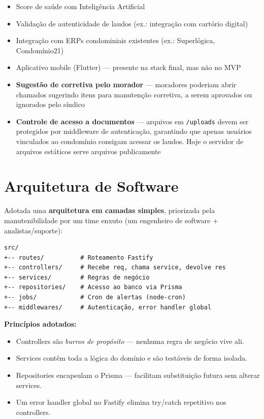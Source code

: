 \documentclass[12pt, a4paper]{article}
\begin{document}
\begin{itemize}[leftmargin=1.5em]
    \item Score de saúde com Inteligência Artificial
    \item Validação de autenticidade de laudos (ex.: integração com cartório digital)
    \item Integração com ERPs condominiais existentes (ex.: Superlógica, Condomínio21)
    \item Aplicativo mobile (Flutter) — presente na stack final, mas não no MVP
    \item \textbf{Sugestão de corretiva pelo morador} — moradores poderiam abrir chamados sugerindo itens para manutenção corretiva, a serem aprovados ou ignorados pelo síndico
    \item \textbf{Controle de acesso a documentos} — arquivos em \texttt{/uploads} devem ser protegidos por middleware de autenticação, garantindo que apenas usuários vinculados ao condomínio consigam acessar os laudos. Hoje o servidor de arquivos estáticos serve arquivos publicamente
\end{itemize}

\vspace{0.5cm}

\section{Arquitetura de Software}
\label{sec:arquitetura}

Adotada uma \textbf{arquitetura em camadas simples}, priorizada pela manutenibilidade
por um time enxuto (um engenheiro de software + analistas/suporte):

\begin{verbatim}
src/
+-- routes/          # Roteamento Fastify
+-- controllers/     # Recebe req, chama service, devolve res
+-- services/        # Regras de negócio
+-- repositories/    # Acesso ao banco via Prisma
+-- jobs/            # Cron de alertas (node-cron)
+-- middlewares/     # Autenticação, error handler global
\end{verbatim}

\textbf{Princípios adotados:}

\begin{itemize}[leftmargin=1.5em]
    \item Controllers são \textit{burros de propósito} — nenhuma regra de negócio vive ali.
    \item Services contêm toda a lógica do domínio e são testáveis de forma isolada.
    \item Repositories encapsulam o Prisma — facilitam substituição futura sem alterar services.
    \item Um error handler global no Fastify elimina try/catch repetitivo nos controllers.
\end{itemize}
\end{document}
